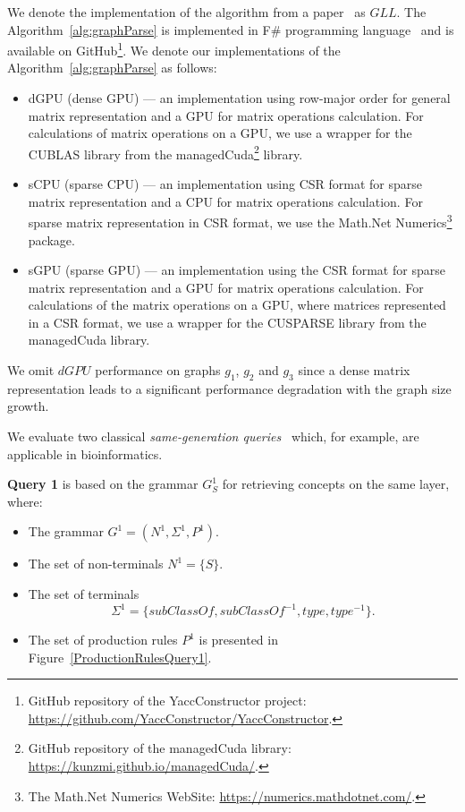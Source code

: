 We denote the implementation of the algorithm from a paper~\cite{GLL} as $GLL$. The Algorithm~\ref{alg:graphParse} is implemented in F\# programming language~\cite{fsharp} and is available on GitHub\footnote{GitHub repository of the YaccConstructor project: \url{https://github.com/YaccConstructor/YaccConstructor}.}. We denote our implementations of the Algorithm~\ref{alg:graphParse} as follows:
\begin{itemize}
    \item dGPU (dense GPU) --- an implementation using row-major order for general matrix representation and a GPU for matrix operations calculation. For calculations of matrix operations on a GPU, we use a wrapper for the CUBLAS library from the managedCuda\footnote{GitHub repository of the managedCuda library: \url{https://kunzmi.github.io/managedCuda/}.} library.
    \item sCPU (sparse CPU) --- an implementation using CSR format for sparse matrix representation and a CPU for matrix operations calculation. For sparse matrix representation in CSR format, we use the Math.Net Numerics\footnote{The Math.Net Numerics WebSite: \url{https://numerics.mathdotnet.com/}.} package.
    \item sGPU (sparse GPU) --- an implementation using the CSR format for sparse matrix representation and a GPU for matrix operations calculation. For calculations of the matrix operations on a GPU, where matrices represented in a CSR format, we use a wrapper for the CUSPARSE library from the managedCuda library.
\end{itemize}

We omit $dGPU$ performance on graphs $g_1$, $g_2$ and $g_3$ since a dense matrix representation leads to a significant performance degradation with the graph size growth. 

We evaluate two classical \textit{same-generation queries}~\cite{FndDB} which, for example, are applicable in bioinformatics.

\textbf{Query 1} is based on the grammar $G^1_S$ for retrieving concepts on the same layer, where:
\begin{itemize}
    \item The grammar $G^1 = (N^1, \Sigma^1, P^1)$.
    \item The set of non-terminals $N^1 = \{S\}$.
    \item The set of terminals $$\Sigma^1 = \{subClassOf, subClassOf^{-1}, type, type^{-1}\}.$$
    \item The set of production rules $P^1$ is presented in Figure~\ref{ProductionRulesQuery1}.
\end{itemize}

